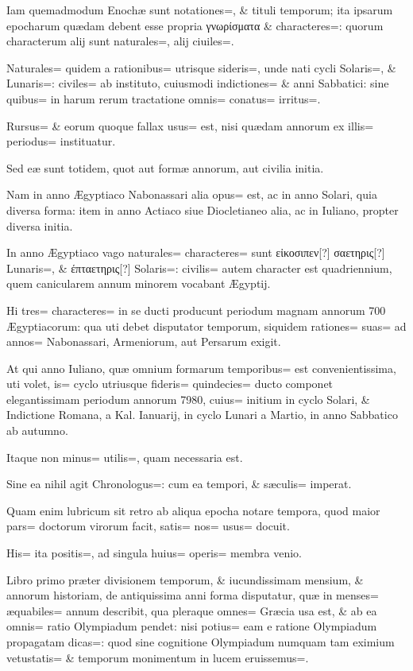 \begin{parnumbers}
Iam quemadmodum Enochæ sunt notationes=, \& tituli temporum; ita ipsarum epocharum quædam debent esse propria γνωρίσματα \& characteres=: quorum characterum alij sunt naturales=, alij ciuiles=. 

Naturales= quidem a rationibus= utrisque sideris=, unde nati cycli Solaris=, \& Lunaris=: civiles= ab instituto, cuiusmodi indictiones= \& anni Sabbatici: sine quibus= in harum rerum tractatione omnis= conatus= irritus=. 

Rursus= \& eorum quoque fallax usus= est, nisi quædam annorum ex illis= periodus= instituatur.

Sed eæ sunt totidem, quot aut formæ annorum, aut civilia initia.

Nam in anno Ægyptiaco Nabonassari alia opus= est, ac in anno Solari, quia diversa forma: item in anno Actiaco siue Diocletianeo alia, ac in Iuliano, propter diversa initia.

In anno Ægyptiaco vago naturales= characteres= sunt εἰκοσιπεν[?] σαετηρις[?] Lunaris=, \& έπταετηρις[?] Solaris=: civilis= autem character est quadriennium, quem canicularem annum minorem vocabant Ægyptij.

Hi tres= characteres= in se ducti producunt periodum magnam annorum 700 Ægyptiacorum: qua uti debet disputator temporum, siquidem rationes= suas= ad annos= Nabonassari, Armeniorum, aut Persarum exigit.

At qui anno Iuliano, quæ omnium formarum temporibus= est convenientissima, uti volet, is= cyclo utriusque fideris= quindecies= ducto componet elegantissimam periodum annorum 7980, cuius= initium in cyclo Solari, \& Indictione Romana, a Kal. Ianuarij, in cyclo Lunari a Martio, in anno Sabbatico ab autumno.

Itaque non minus= utilis=, quam necessaria est.

Sine ea nihil agit Chronologus=: cum ea tempori, \& sæculis= imperat.

Quam enim lubricum sit retro ab aliqua epocha notare tempora, quod maior pars= doctorum virorum facit, satis= nos= usus= docuit.

His= ita positis=, ad singula huius= operis= membra venio.

Libro primo præter divisionem temporum, \& iucundissimam mensium, \& annorum historiam, de antiquissima anni forma disputatur, quæ in menses= æquabiles= annum describit, qua pleraque omnes= Græcia usa est, \& ab ea omnis= ratio Olympiadum pendet: nisi potius= eam e ratione Olympiadum propagatam dicas=: quod sine cognitione Olympiadum numquam tam eximium vetustatis= \& 
temporum monimentum in lucem eruissemus=. 


\end{parnumbers}
